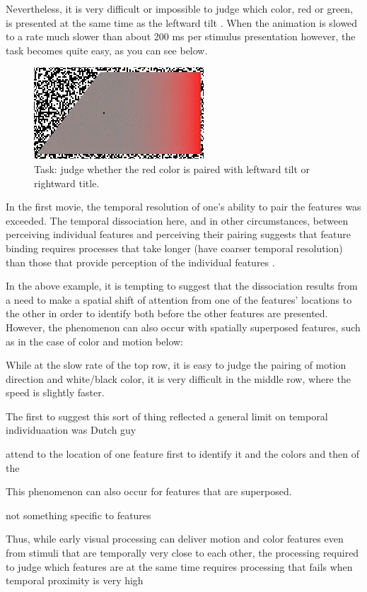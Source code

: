\documentclass[
]{book}
\begin{document}
Nevertheless, it is very difficult or impossible to judge which color, red or green, is presented at the same time as the leftward tilt \citep{holcombeEarlyBindingFeature2001}. When the animation is slowed to a rate much slower than about 200 ms per stimulus presentation however, the task becomes quite easy, as you can see below.

\begin{figure}
\includegraphics[width=0.3\linewidth]{movies/binding/colorgrdnt2_2fpsStatic} \caption{Task: judge whether the red color is paired with leftward tilt or rightward title.}\label{fig:unnamed-chunk-7}
\end{figure}

In the first movie, the temporal resolution of one's ability to pair the features was exceeded. The temporal dissociation here, and in other circumstances, between perceiving individual features and perceiving their pairing suggests that feature binding requires processes that take longer (have coarser temporal resolution) than those that provide perception of the individual features \citep{holcombeSeeingSlowSeeing2009, fujisakiCommonPerceptualTemporal2010b}.

In the above example, it is tempting to suggest that the dissociation results from a need to make a spatial shift of attention from one of the features' locations to the other in order to identify both before the other features are presented. However, the phenomenon can also occur with spatially superposed features, such as in the case of color and motion below:

While at the slow rate of the top row, it is easy to judge the pairing of motion direction and white/black color, it is very difficult in the middle row, where the speed is slightly faster.

The first to suggest this sort of thing reflected a general limit on temporal individuaation was Dutch guy

attend to the location of one feature first to identify it and
the colors and then of the

This phenomenon can also occur for features that are superposed.

not something specific to features

Thus, while early visual processing can deliver motion and color features even from stimuli that are temporally very close to each other, the processing required to judge which features are at the same time requires processing that fails when temporal proximity is very high
\end{document}
